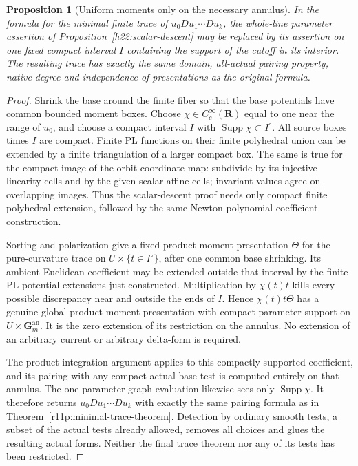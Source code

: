 \documentclass[11pt,a4paper]{article}
\newtheorem{proposition}[theorem]{Proposition}
\theoremstyle{definition}
\theoremstyle{remark}
\newcommand{\R}{\mathbf R}
\newcommand{\an}{\mathrm{an}}
\newcommand{\Supp}{\operatorname{Supp}}
\begin{document}
\begin{proposition}[Uniform moments only on the necessary annulus]
\label{h22:compact-parameter}
In the formula for the minimal finite trace of
$u_0Du_1\cdots Du_k$, the whole-line parameter assertion of
Proposition~\ref{h22:scalar-descent} may be replaced by its assertion
on one fixed compact interval $I$ containing the support of the cutoff
in its interior. The resulting trace has exactly the same domain,
all-actual pairing property, native degree and independence of
presentations as the original formula.
\end{proposition}
\begin{proof}
Shrink the base around the finite fiber so that the base potentials
have common bounded moment boxes. Choose $\chi\in C_c^\infty(\R)$
equal to one near the range of $u_0$, and choose a compact interval
$I$ with $\Supp\chi\subset I^\circ$. All source boxes times $I$
are compact. Finite PL functions on their finite polyhedral union
can be extended by a finite triangulation of a larger compact box.
The same is true for the compact image of the orbit-coordinate map:
subdivide by its injective linearity cells and by the given scalar
affine cells; invariant values agree on overlapping images. Thus the
scalar-descent proof needs only compact finite polyhedral extension,
followed by the same Newton-polynomial coefficient construction.

Sorting and polarization give a fixed product-moment presentation
$\Theta$ for the pure-curvature trace on
$U\times\{t\in I^\circ\}$, after one common base shrinking.
Its ambient Euclidean coefficient may be extended outside that
interval by the finite PL potential extensions just constructed.
Multiplication by $\chi(t)t$ kills every possible discrepancy near
and outside the ends of $I$. Hence $\chi(t)t\Theta$ has a genuine
global product-moment presentation with compact parameter support
on $U\times\mathbf G_m^{\an}$. It is the zero extension of its
restriction on the annulus. No extension of an arbitrary current or
arbitrary delta-form is required.

The product-integration argument applies to this compactly supported
coefficient, and its pairing with any compact actual base test is
computed entirely on that annulus. The one-parameter graph evaluation
likewise sees only $\Supp\chi$. It therefore returns
$u_0Du_1\cdots Du_k$ with exactly the same pairing formula as in
Theorem~\ref{r11p:minimal-trace-theorem}. Detection by ordinary smooth tests, a subset of the actual
tests already allowed, removes all choices and glues the resulting
actual forms. Neither the final trace theorem nor any of its tests
has been restricted.
\end{proof}
\end{document}
